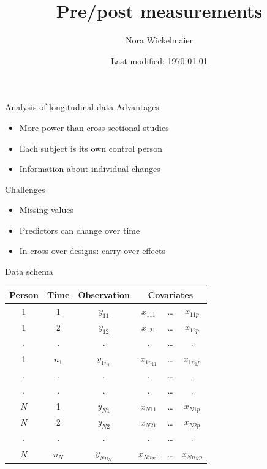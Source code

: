 \documentclass[aspectratio=169]{beamer}
\title{Pre/post measurements}
\author{Nora Wickelmaier}
\date{Last modified: \today}
\begin{document}
\begin{frame}{}
\thispagestyle{empty}
\titlepage
\end{frame}

\begin{frame}{Analysis of longitudinal data}
Advantages

\begin{itemize}
\item More power than cross sectional studies
\item Each subject is its own control person
\item Information about individual changes
\end{itemize}

Challenges
\begin{itemize}
\item Missing values
\item Predictors can change over time
\item In cross over designs: carry over effects
\end{itemize}
\end{frame}

\begin{frame}{Data schema}
\vfill
\begin{center}
\begin{tabular}{cccccc}
\hline
Person & Time      & Observation & \multicolumn{3}{c}{Covariates}\\\hline
1      & 1         & $y_{11}$    & $x_{111}$   & \dots & $x_{11p}$  \\
1      & 2         & $y_{12}$    & $x_{121}$   & \dots & $x_{12p}$  \\
.      & .         & .           & .           & \dots & .          \\
1      & $n_1$     & $y_{1n_1}$  & $x_{1n_11}$ & \dots & $x_{1n_1p}$\\
.      & .         & .           & .           & \dots & .          \\
.      & .         & .           & .           & \dots & .          \\
$N$    & 1         & $y_{N1}$    & $x_{N11}$   & \dots & $x_{N1p}$  \\
$N$    & 2         & $y_{N2}$    & $x_{N21}$   & \dots & $x_{N2p}$  \\
.      & .         & .           & .           & \dots & .          \\
$N$    & $n_N$     & $y_{Nn_N}$  & $x_{Nn_N1}$ & \dots & $x_{Nn_Np}$\\
\hline
\end{tabular}
\end{center}
\vfill
\end{frame}
\end{document}
